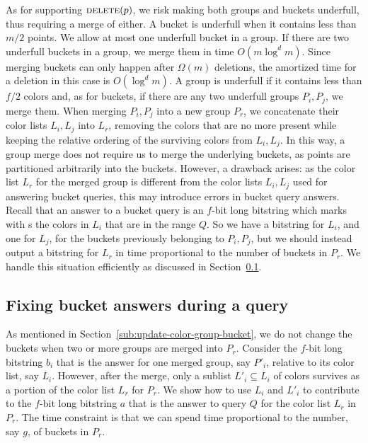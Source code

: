 As for supporting $\textsc{delete}(p)$, we risk making both groups and buckets underfull, thus requiring a merge of either. A bucket is underfull when it contains less than $m/2$ points. We allow at most one underfull bucket in a group. If there are two underfull buckets in a group, we merge them in time $O(m \log^d m)$. Since merging buckets can only happen after $\Omega(m)$ deletions, the amortized time for a deletion in this case is $O(\log^d m)$. A group is underfull if it contains less than $f/2$ colors and, as for buckets, if there are any two underfull groups $P_i, P_j$, we merge them. When merging $P_i, P_j$ into a new group $P_r$, we concatenate their color lists $L_i, L_j$ into $L_r$, removing the colors that are no more present while keeping the relative ordering of the surviving colors from $L_i, L_j$. In this way, a group merge does not require us to merge the underlying buckets, as points are partitioned arbitrarily into the buckets. However, a drawback arises: as the color list $L_r$ for the merged group is different from the color lists $L_i, L_j$ used for answering bucket queries, this may introduce errors in bucket query answers. Recall that an answer to a bucket query is an $f$-bit long bitstring which marks with {\bitone}s the colors in $L_i$ that are in the range $Q$. So we have a bitstring for $L_i$, and one for $L_j$, for the buckets previously belonging to $P_i, P_j$, but we should instead output a bitstring for $L_r$ in time proportional to the number of buckets in $P_r$. We handle this situation efficiently as discussed in Section~\ref{sub:fixing-bucket-answers}.

\subsection{Fixing bucket answers during a query}
\label{sub:fixing-bucket-answers}
%
As mentioned in Section~\ref{sub:update-color-group-bucket}, we do not change the buckets when two or more groups are merged into $P_r$. Consider the $f$-bit long bitstring $b_i$ that is the answer for one merged group, say $P'_i$, relative to its color list, say $L_i$. However, after the merge, only a sublist $L'_i \subseteq L_i$ of colors survives as a portion of the color list $L_r$ for $P_r$. We show how to use $L_i$ and $L'_i$ to contribute to the $f$-bit long bitstring $a$ that is the answer to query $Q$ for the color list $L_r$ in $P_r$. The time constraint is that we can spend time proportional to the number, say $g$, of buckets in $P_r$. 




